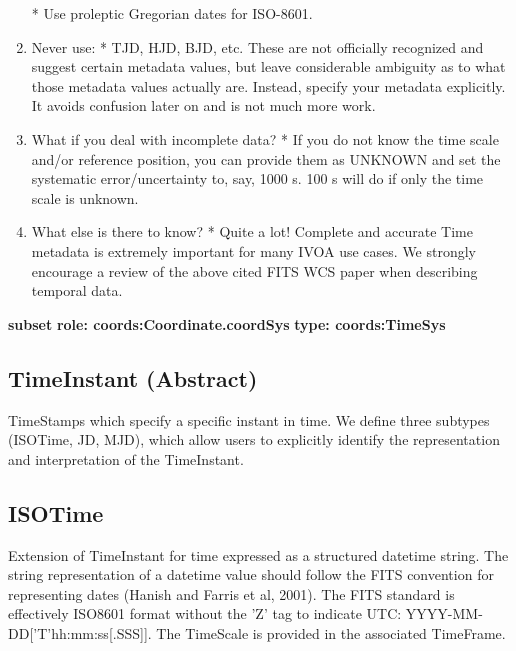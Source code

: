 \begin{enumerate}
     * Use proleptic Gregorian dates for ISO-8601.
    \item Never use:  \newline
     * TJD, HJD, BJD, etc. These are not officially recognized and suggest certain metadata values, but leave considerable ambiguity as to what those metadata values actually are. Instead, specify your metadata explicitly. It avoids confusion later on and is not much more work.
    \item What if you deal with incomplete data?  \newline
     * If you do not know the time scale and/or reference position, you can provide them as UNKNOWN and set the systematic error/uncertainty to, say, 1000 s. 100 s will do if only the time scale is unknown.
    \item What else is there to know?  \newline
     * Quite a lot! Complete and accurate Time metadata is extremely important for many IVOA use cases. We strongly encourage a review of the above cited FITS WCS paper when describing temporal data.\newline
    \end{enumerate}

    \noindent \textbf{subset} \newline
    \indent   \textbf{role: coords:Coordinate.coordSys} \newline
    \indent   \textbf{type: coords:TimeSys} \newline

  \subsection{TimeInstant (Abstract)}
  \label{sect:TimeInstant}
    TimeStamps which specify a specific instant in time. We define three subtypes (ISOTime, JD, MJD), which allow users to explicitly identify the representation and interpretation of the TimeInstant.

  \subsection{ISOTime}
  \label{sect:ISOTime}
    Extension of TimeInstant for time expressed as a structured datetime string. The string representation of a datetime value should follow the FITS convention for representing dates (Hanish and Farris et al, 2001). The FITS standard is effectively ISO8601 format without the 'Z' tag to indicate UTC: YYYY-MM-DD['T'hh:mm:ss[.SSS]]. The TimeScale is provided in the associated TimeFrame.


